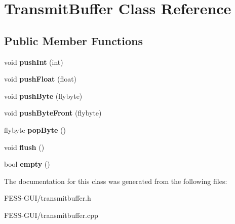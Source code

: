 \hypertarget{class_transmit_buffer}{}\section{Transmit\+Buffer Class Reference}
\label{class_transmit_buffer}
\subsection*{Public Member Functions}
\begin{DoxyCompactItemize}
\item 
\hypertarget{class_transmit_buffer_aedb208968c943ed3913ebb92bdd8d503}{}\label{class_transmit_buffer_aedb208968c943ed3913ebb92bdd8d503} 
void {\bfseries push\+Int} (int)
\item 
\hypertarget{class_transmit_buffer_ad6f2bf1d6851b298590cd002fb62d8c4}{}\label{class_transmit_buffer_ad6f2bf1d6851b298590cd002fb62d8c4} 
void {\bfseries push\+Float} (float)
\item 
\hypertarget{class_transmit_buffer_a9b60d63a662ff83c8d5d03cd6646628e}{}\label{class_transmit_buffer_a9b60d63a662ff83c8d5d03cd6646628e} 
void {\bfseries push\+Byte} (flybyte)
\item 
\hypertarget{class_transmit_buffer_a2390bed50bee25863d62b88f99df3c16}{}\label{class_transmit_buffer_a2390bed50bee25863d62b88f99df3c16} 
void {\bfseries push\+Byte\+Front} (flybyte)
\item 
\hypertarget{class_transmit_buffer_ae69cb23f10c0d0e053bae6f5812bcd04}{}\label{class_transmit_buffer_ae69cb23f10c0d0e053bae6f5812bcd04} 
flybyte {\bfseries pop\+Byte} ()
\item 
\hypertarget{class_transmit_buffer_a574f5ab5eca07b5ee8a517812cd7d87a}{}\label{class_transmit_buffer_a574f5ab5eca07b5ee8a517812cd7d87a} 
void {\bfseries flush} ()
\item 
\hypertarget{class_transmit_buffer_af3396e1989bd10f06bc9d8fd8b810da4}{}\label{class_transmit_buffer_af3396e1989bd10f06bc9d8fd8b810da4} 
bool {\bfseries empty} ()
\end{DoxyCompactItemize}


The documentation for this class was generated from the following files\+:\begin{DoxyCompactItemize}
\item 
F\+E\+S\+S-\/\+G\+U\+I/transmitbuffer.\+h\item 
F\+E\+S\+S-\/\+G\+U\+I/transmitbuffer.\+cpp\end{DoxyCompactItemize}
